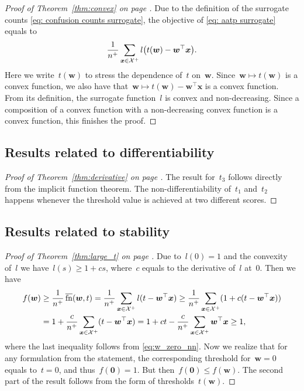 \thmconvex*
\begin{proof}[Proof of Theorem~\ref{thm:convex} on page \pageref{thm:convex}]
  Due to the definition of the surrogate counts \eqref{eq: confusion counts surrogate}, the objective of \eqref{eq: aatp surrogate} equals to
  \begin{equation*}
    \frac{1}{n^+}\sum_{\bm{x} \in \Xc^+} l\Brac{t(\bm{w})-\bm{w}^\top \bm{x}}.
  \end{equation*}
  Here we write~$t(\bm{w})$ to stress the dependence of~$t$ on~$\bm{w}$. Since~$\bm{w}\mapsto t(\bm{w})$ is a convex function, we also have that~$\bm{w}\mapsto t(\bm{w})-\bm{w}^\top \bm{x}$ is a convex function. From its definition, the surrogate function~$l$ is convex and non-decreasing. Since a composition of a convex function with a non-decreasing convex function is a convex function, this finishes the proof.
\end{proof}

\subsection{Results related to differentiability}

\derivative*
\begin{proof}[Proof of Theorem~\ref{thm:derivative} on page \pageref{thm:derivative}]
  The result for~$t_3$ follows directly from the implicit function theorem. The non-differentiability of~$t_1$ and~$t_2$ happens whenever the threshold value is achieved at two different scores.
\end{proof}

\subsection{Results related to stability}

\larget*
\begin{proof}[Proof of Theorem~\ref{thm:large_t} on page \pageref{thm:large_t}]
  Due to~$l(0)=1$ and the convexity of~$l$ we have~$l(s)\ge 1+cs$, where~$c$ equals to the derivative of~$l$ at~$0$. Then we have
  \begin{equation*}
    \begin{aligned}
      f(\bm{w}) 
      & \ge \frac{1}{n^+}\operatorname{\overline{fn}}(\bm{w}, t) = \frac{1}{n^+}\sum_{\bm{x} \in \mathcal{X}^+}l(t-\bm{w}^\top \bm{x}) \ge \frac{1}{n^+}\sum_{\bm{x} \in \mathcal{X}^+}(1+c(t-\bm{w}^\top \bm{x})) \\
      & = 1+\frac{c}{n^+}\sum_{\bm{x} \in \mathcal{X}^+}(t-\bm{w}^\top \bm{x}) = 1+ct - \frac{c}{n^+}\sum_{\bm{x} \in \mathcal{X}^+}\bm{w}^\top \bm{x} \ge 1,
    \end{aligned}
  \end{equation*}
  where the last inequality follows from \eqref{eq:w_zero_nn}. Now we realize that for any formulation from the statement, the corresponding threshold for~$\bm{w}=0$ equals to~$t=0$, and thus~$f(\bm{0})=1$. But then~$f(\bm{0})\le f(\bm{w})$. The second part of the result follows from the form of thresholds~$t(\bm{w})$.
\end{proof}

